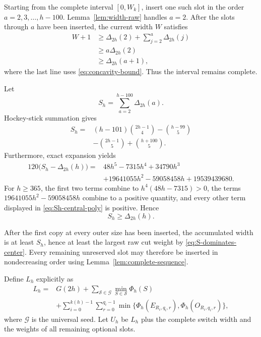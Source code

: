 \documentclass[11pt]{article}
\theoremstyle{definition}
\theoremstyle{remark}
\newcommand{\C}[2]{\binom{#1}{#2}}
\begin{document}
Starting from the complete interval $[0,W_k]$, insert one such slot in the
order $a=2,3,\ldots,h-100$.  Lemma~\ref{lem:width-raw} handles $a=2$.
After the slots through $a$ have been inserted, the current width $W$ satisfies
\begin{align*}
  W+1
  &\ge \Delta_{2h}(2)+\sum_{j=2}^{a}\Delta_{2h}(j)\\
  &\ge a\Delta_{2h}(2)\\
  &\ge\Delta_{2h}(a+1),
\end{align*}
where the last line uses \eqref{eq:concavity-bound}.  Thus the interval remains
complete.

Let
\begin{equation}\label{eq:Sh-def}
  S_h=\sum_{a=2}^{h-100}\Delta_{2h}(a).
\end{equation}
Hockey-stick summation gives
\begin{equation}\label{eq:Sh-closed}
\begin{split}
  S_h={}&(h-101)\C{2h-1}{4}-\C{h-99}{5}\\
       &-\C{2h-1}{5}+\C{h+100}{5}.
\end{split}
\end{equation}
Furthermore, exact expansion yields
\begin{equation}\label{eq:Sh-central-poly}
\begin{split}
  120\bigl(S_h-\Delta_{2h}(h)\bigr)
  ={}&48h^5-7315h^4+34790h^3\\
    &+19641055h^2-59058458h+19539439680.
\end{split}
\end{equation}
For $h\ge365$, the first two terms combine to
$h^4(48h-7315)>0$, the terms
$19641055h^2-59058458h$ combine to a positive quantity, and every other
term displayed in \eqref{eq:Sh-central-poly} is positive.  Hence
\begin{equation}\label{eq:S-dominates-center}
  S_h\ge\Delta_{2h}(h).
\end{equation}

After the first copy at every outer size has been inserted, the accumulated
width is at least $S_h$, hence at least the largest raw cut weight by
\eqref{eq:S-dominates-center}.  Every remaining unreserved slot may therefore
be inserted in nondecreasing order using
Lemma~\ref{lem:complete-sequence}.

Define $L_h$ explicitly as
\begin{equation}\label{eq:Lh-def}
\begin{split}
 L_h={}&G(2h)
 +\sum_{\mathcal S\in\mathcal G}
   \min_{S\in\mathcal S}\Phi_h(S)\\
 &+\sum_{i=0}^{k(h)-1}\sum_{r=0}^{q_i-1}
   \min\bigl\{\Phi_h(E_{R_i,q_i,r}),
               \Phi_h(O_{R_i,q_i,r})\bigr\},
\end{split}
\end{equation}
where $\mathcal G$ is the universal seed.  Let $U_h$ be $L_h$ plus the
complete switch width and the weights of all remaining optional slots.
\end{document}
